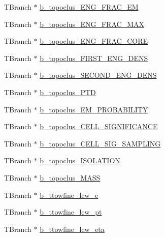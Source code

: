 \begin{DoxyCompactItemize}
\item 
T\+Branch $\ast$ \hyperlink{classJetAnalysisExample_a760a68a44dfed9a8a679d35143c4435c}{b\+\_\+topoclus\+\_\+\+E\+N\+G\+\_\+\+F\+R\+A\+C\+\_\+\+EM}
\item 
T\+Branch $\ast$ \hyperlink{classJetAnalysisExample_ac67113776064ee6213a05b1e4e5b584a}{b\+\_\+topoclus\+\_\+\+E\+N\+G\+\_\+\+F\+R\+A\+C\+\_\+\+M\+AX}
\item 
T\+Branch $\ast$ \hyperlink{classJetAnalysisExample_a438b417761b7fede94a47edf0aa42b1c}{b\+\_\+topoclus\+\_\+\+E\+N\+G\+\_\+\+F\+R\+A\+C\+\_\+\+C\+O\+RE}
\item 
T\+Branch $\ast$ \hyperlink{classJetAnalysisExample_ac6bec565ec57ccd158a4187b44196260}{b\+\_\+topoclus\+\_\+\+F\+I\+R\+S\+T\+\_\+\+E\+N\+G\+\_\+\+D\+E\+NS}
\item 
T\+Branch $\ast$ \hyperlink{classJetAnalysisExample_a0799969edb9620e82ea737ed1ff70ff4}{b\+\_\+topoclus\+\_\+\+S\+E\+C\+O\+N\+D\+\_\+\+E\+N\+G\+\_\+\+D\+E\+NS}
\item 
T\+Branch $\ast$ \hyperlink{classJetAnalysisExample_a992fea656a3d9ef2955ff5865eae3103}{b\+\_\+topoclus\+\_\+\+P\+TD}
\item 
T\+Branch $\ast$ \hyperlink{classJetAnalysisExample_a624a9b046e7917dd14754edbffa81f22}{b\+\_\+topoclus\+\_\+\+E\+M\+\_\+\+P\+R\+O\+B\+A\+B\+I\+L\+I\+TY}
\item 
T\+Branch $\ast$ \hyperlink{classJetAnalysisExample_aae1636c1ccdf27fc118c71e846ac689e}{b\+\_\+topoclus\+\_\+\+C\+E\+L\+L\+\_\+\+S\+I\+G\+N\+I\+F\+I\+C\+A\+N\+CE}
\item 
T\+Branch $\ast$ \hyperlink{classJetAnalysisExample_a409bcde72a0e0d600260bfb603f630c6}{b\+\_\+topoclus\+\_\+\+C\+E\+L\+L\+\_\+\+S\+I\+G\+\_\+\+S\+A\+M\+P\+L\+I\+NG}
\item 
T\+Branch $\ast$ \hyperlink{classJetAnalysisExample_aaba5e8f3af07fe5c95e35cbf6dc794fe}{b\+\_\+topoclus\+\_\+\+I\+S\+O\+L\+A\+T\+I\+ON}
\item 
T\+Branch $\ast$ \hyperlink{classJetAnalysisExample_a01471cec67657b24acba11aee6328a2b}{b\+\_\+topoclus\+\_\+\+M\+A\+SS}
\item 
T\+Branch $\ast$ \hyperlink{classJetAnalysisExample_a3c9a7ec4e18695a20f0d1f8bbe8bf674}{b\+\_\+ttowfine\+\_\+lcw\+\_\+e}
\item 
T\+Branch $\ast$ \hyperlink{classJetAnalysisExample_a31e478107c9936070766492d689cc01a}{b\+\_\+ttowfine\+\_\+lcw\+\_\+pt}
\item 
T\+Branch $\ast$ \hyperlink{classJetAnalysisExample_a7edc52ea898374c421b433b05225e178}{b\+\_\+ttowfine\+\_\+lcw\+\_\+eta}

\end{DoxyCompactItemize}
